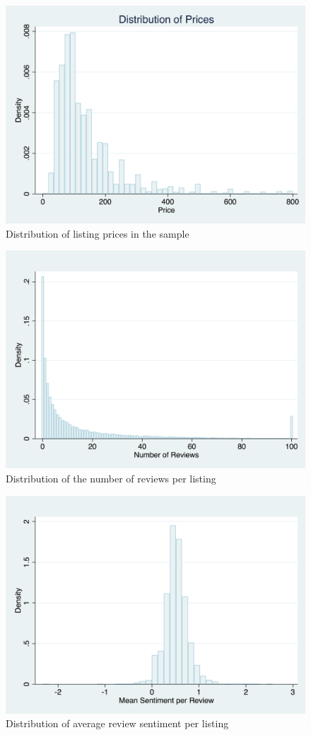 \begin{figure}\centering
	\includegraphics[width=.9\textwidth]{figures/fig1_price}
	\caption{Distribution of listing prices in the sample}
	\label{fig:prices}
\end{figure}

\begin{figure}\centering
	\includegraphics[width=.8\textwidth]{figures/fig2_num_reviews}
	\caption{Distribution of the number of reviews per listing}
	\label{fig:num_reviews}
\end{figure}

\begin{figure}\centering
	\includegraphics[width=.8\textwidth]{figures/fig3_review_sentiment}
	\caption{Distribution of average review sentiment per listing}
	\label{fig:sentiment}
\end{figure}

